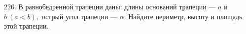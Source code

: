 226. В равнобедренной трапеции даны: длины оснований трапеции --- $a$ и $b\ (a<b),$ острый угол трапеции --- $\alpha.$ Найдите периметр, высоту и площадь этой трапеции.\\
